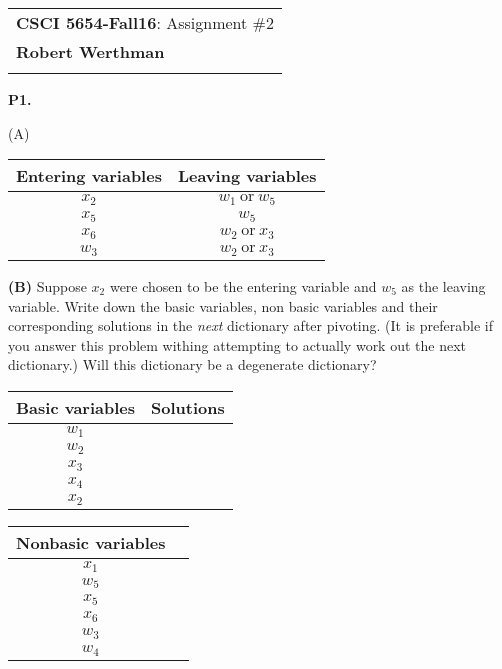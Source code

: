 \documentclass[11pt]{article}
\begin{document}
\begin{tabular}{l}
\textbf{CSCI 5654-Fall16}: Assignment \#2 \\

\textbf{Robert Werthman} \phantom{Supercalifragilisticexpialidocius Smith}\\
\hline
\\[10pt]
\end{tabular}

\noindent
\textbf{P1.}


\noindent (A)
\begin{center}
\begin{tabular}{|c|c|}
\hline
Entering variables & Leaving variables\\
\hline
$x_2$ & $w_1\ \text{or}\ w_5$ \\
\hline
$x_5$ & $w_5$\\
\hline
$x_6$ & $w_2\ \text{or}\ x_3$\\
\hline
$w_3$ & $w_2\ \text{or}\ x_3$\\
\hline
\end{tabular}
\end{center}

\medskip

\noindent\textbf{(B)} Suppose $x_2$ were chosen to be the entering
variable and $w_5$ as the leaving variable. Write down the basic
variables, non basic variables and their corresponding solutions in
the  \emph{next} dictionary after pivoting. (It is preferable if you
answer this problem withing  attempting to actually work out the next
dictionary.) Will this dictionary be a
degenerate dictionary?

\begin{center}
\begin{tabular}{|c|c|}
\hline
Basic variables & Solutions\\
\hline
$w_1$ & \\ \hline
$w_2$ & \\ \hline
$x_3$ & \\ \hline
$x_4$ & \\ \hline
$x_2$ & \\ \hline
\end{tabular}
\hspace{1cm}
\begin{tabular}{|c|c|}
\hline
Nonbasic variables\\
\hline
$x_1$\\ \hline
$w_5$\\ \hline
$x_5$\\ \hline
$x_6$\\ \hline
$w_3$\\ \hline
$w_4$\\ \hline
\end{tabular}
\end{center}
\end{document}
